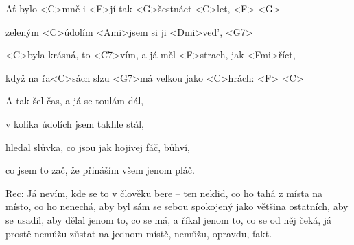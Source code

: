 

\zs
Ať bylo <C>mně i <F>jí tak <G>šestnáct <C>let, <F> <G>

zeleným <C>údolím <Ami>jsem si ji <Dmi>ved', <G7>

<C>byla krásná, to <C7>vím, a já měl <F>strach, jak <Fmi>říct,

když na řa<C>sách slzu <G7>má velkou jako <C>hrách: <F> <C>
\ks

\zr
{}
\kr

\zs
A tak šel čas, a já se toulám dál,

v kolika údolích jsem takhle stál,

hledal slůvka, co jsou jak hojivej fáč, bůhví,

co jsem to zač, že přináším všem jenom pláč.
\ks

\zr\kr

Rec: Já nevím, kde se to v člověku bere -- ten neklid, co ho tahá z místa na 
místo, co ho nenechá, aby byl sám se sebou spokojený jako většina ostatních, 
aby se usadil, aby dělal jenom to, co se má, a říkal jenom to, co se od něj 
čeká, já prostě nemůžu zůstat na jednom místě, nemůžu, opravdu, fakt.

\zr\kr

\kp
